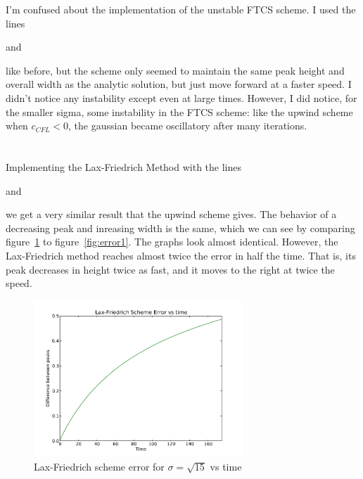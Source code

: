 \documentclass[11pt,letterpaper]{article}
\begin{document}
I'm confused about the implementation of the unstable FTCS scheme. I used the lines


and 

like before, but the scheme only seemed to maintain the same peak height and overall width
as the analytic solution, but just move forward at a faster speed. I didn't notice any 
instability except even at large times. However, I did notice, for the smaller sigma, some 
instability in the FTCS scheme: like the upwind scheme when $c_{CFL} < 0$, the gaussian
became oscillatory after many iterations.

\section{}

Implementing the Lax-Friedrich Method with the lines


and 

we get a very similar result that the upwind scheme gives. The behavior
of a decreasing peak and inreasing width is the same, which we can see by
comparing figure~\ref{fig:errorlax} to figure~\ref{fig:error1}. The graphs look almost 
identical. However, the Lax-Friedrich method reaches almost twice the error in half 
the time. That is, its peak decreases in height twice as fast, and it moves to the right
at twice the speed.

\begin{figure}[bth]
\centering
\includegraphics[width=0.7\textwidth]{error-lax.pdf}
\caption{Lax-Friedrich scheme error for $\sigma = \sqrt{15}$ vs time}
\label{fig:errorlax}
\end{figure}
\end{document}
